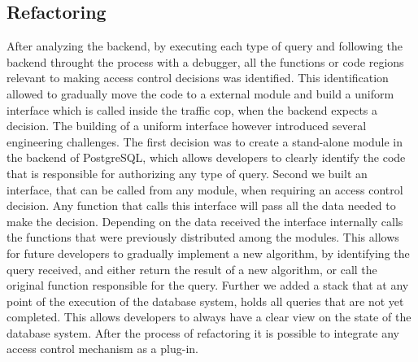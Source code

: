 \subsection{Refactoring}
%
After analyzing the backend, by executing each type of query and following the backend throught the process with a debugger, all the functions or code regions relevant to making access control decisions was identified.
%
This identification allowed to gradually move the code to a external module and build a uniform interface which is called inside the traffic cop, when the backend expects a decision.
%
The building of a uniform interface however introduced several engineering challenges.
%
The first decision was to create a stand-alone module in the backend of PostgreSQL, which allows developers to clearly identify the code that is responsible for authorizing any type of query.
%
Second we built an interface, that can be called from any module, when requiring an access control decision.
%
Any function that calls this interface will pass all the data needed to make the decision.
%
Depending on the data received the interface internally calls the functions that were previously distributed among the modules.
%
This allows for future developers to gradually implement a new algorithm, by identifying the query received, and either return the result of a new algorithm, or call the original function responsible for the query.
%
Further we added a stack that at any point of the execution of the database system, holds all queries that are not yet completed.
%
This allows developers to always have a clear view on the state of the database system.
%
After the process of refactoring it is possible to integrate any access control mechanism as a plug-in.